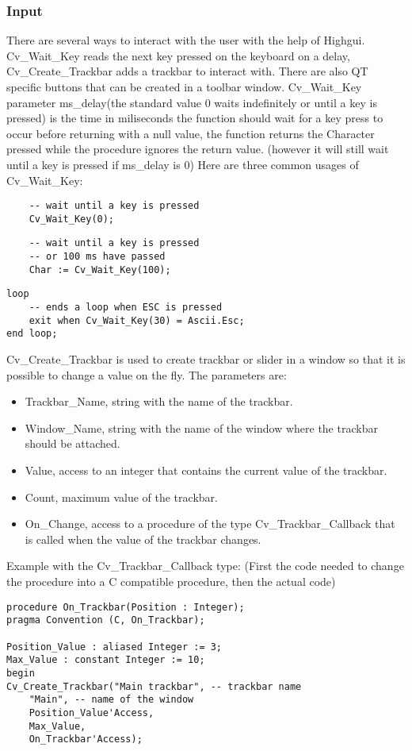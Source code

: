 \subsubsection{Input}
There are several ways to interact with the user with the help of Highgui. Cv_Wait_Key reads the next key pressed on the keyboard on a delay, Cv_Create_Trackbar adds a trackbar to interact with. There are also QT specific buttons that can be created in  a toolbar window.
Cv_Wait_Key parameter ms_delay(the standard value 0 waits indefinitely or until a key is pressed)  is the time in miliseconds the function should wait for a key press to occur before returning with a null value, the function returns the Character pressed while the procedure ignores the return value. (however it will still wait until a key is pressed if ms_delay is 0)
Here are three common usages of Cv_Wait_Key:
\begin{lstlisting}
	-- wait until a key is pressed
	Cv_Wait_Key(0);
\end{lstlisting}
\begin{lstlisting}
	-- wait until a key is pressed
	-- or 100 ms have passed
	Char := Cv_Wait_Key(100); 
\end{lstlisting}
\begin{lstlisting}
loop
	-- ends a loop when ESC is pressed
	exit when Cv_Wait_Key(30) = Ascii.Esc; 
end loop;
\end{lstlisting}
Cv_Create_Trackbar is used to create trackbar or slider in a window so that it is possible to change a value on the fly. The parameters are:
\begin{itemize}
\item Trackbar_Name, string with the name of the trackbar.
\item Window_Name, string with the name of the window where the trackbar should be attached.
\item Value, access to an integer that contains the current value of the trackbar.
\item Count, maximum value of the trackbar.
\item On_Change, access to a procedure of the type Cv_Trackbar_Callback that is called when the value of the trackbar changes.
\end{itemize}
Example with the Cv_Trackbar_Callback type: (First the code needed to change the procedure into a C compatible procedure, then the actual code)
\begin{lstlisting}
procedure On_Trackbar(Position : Integer);
pragma Convention (C, On_Trackbar);

Position_Value : aliased Integer := 3;
Max_Value : constant Integer := 10;
begin
Cv_Create_Trackbar("Main trackbar", -- trackbar name
	"Main", -- name of the window
	Position_Value'Access,
	Max_Value,
	On_Trackbar'Access);
\end{lstlisting}
